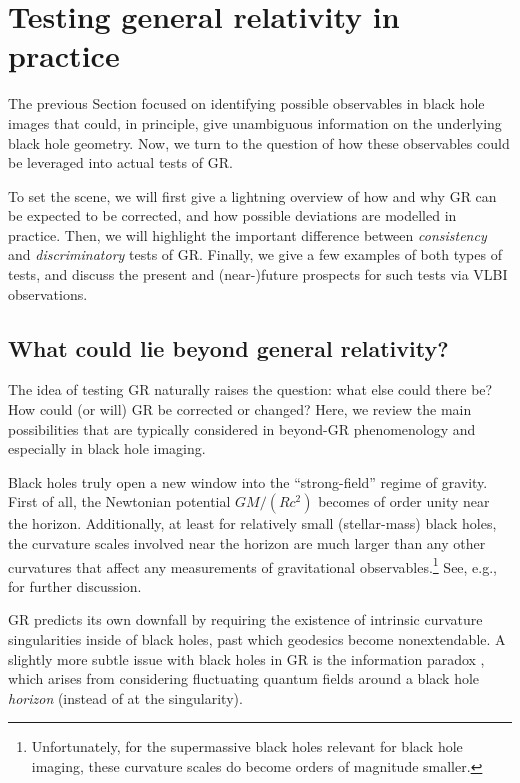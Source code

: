 \documentclass[graybox,envcountchap]{svmult}
\begin{document}
\section{Testing general relativity in practice}\label{sec:Testing}

The previous Section focused on identifying possible observables in black hole images that could, in principle, give unambiguous information on the underlying black hole geometry.
Now, we turn to the question of how these observables could be leveraged into actual tests of GR.

To set the scene, we will first give a lightning overview of how and why GR can be expected to be corrected, and how possible deviations are modelled in practice.
Then, we will highlight the important difference between \emph{consistency} and \emph{discriminatory} tests of GR.
Finally, we give a few examples of both types of tests, and discuss the present and (near-)future prospects for such tests via VLBI observations.

\subsection{What could lie beyond general relativity?}\label{sec:BeyondEinstein}

The idea of testing GR naturally raises the question: what else could there be?
How could (or will) GR be corrected or changed?
Here, we review the main possibilities that are typically considered in beyond-GR phenomenology and especially in black hole imaging.

Black holes truly open a new window into the ``strong-field'' regime of gravity.
First of all, the Newtonian potential $GM/(Rc^2)$ becomes of order unity near the horizon.
Additionally, at least for relatively small (stellar-mass) black holes, the curvature scales involved near the horizon are much larger than any other curvatures that affect any measurements of gravitational observables.\footnote{Unfortunately, for the supermassive black holes relevant for black hole imaging, these curvature scales do become orders of magnitude smaller.}
See, e.g., \cite{Psaltis2019} for further discussion.

GR predicts its own downfall by requiring the existence of intrinsic curvature singularities inside of black holes, past which geodesics become nonextendable.
A slightly more subtle issue with black holes in GR is  the information paradox \cite{Mathur2009}, which arises from considering fluctuating quantum fields around a black hole \emph{horizon} (instead of at the singularity).
\end{document}
